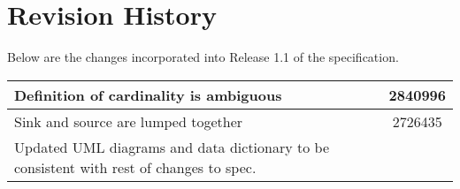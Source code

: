 \chapter{Revision History}

Below are the changes incorporated into Release 1.1 of the \SBGNPDLone specification.

\begin{center}
\label{tab:revision history}
\tablelasttail{\hline}
\begin{supertabular}{|p{12cm}|c|}\hline
Definition of cardinality is ambiguous & 2840996 \\\hline
Sink and source are lumped together & 2726435 \\\hline
Updated UML diagrams and data dictionary  to be consistent with rest of changes to spec. & \\\hline
\end{supertabular}
\end{center}
